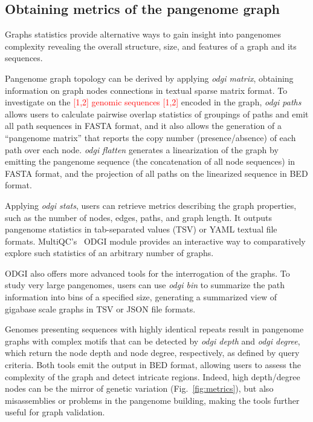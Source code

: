 \documentclass{bioinfo}
\newcommand{\REVIEWED}[1]{{\textcolor{Red}{#1}}}
\begin{document}


\subsection{Obtaining metrics of the pangenome graph}
\label{sec:metrics}

Graphs statistics provide alternative ways to gain insight into pangenomes complexity revealing the overall structure, size, and features of a graph and its sequences.

Pangenome graph topology can be derived by applying \textit{odgi matrix}, obtaining information on graph nodes connections in textual sparse matrix format.
To investigate on the \REVIEWED{[1,2] genomic sequences [1,2]} encoded in the graph, \textit{odgi paths} allows users to calculate pairwise overlap statistics of groupings of paths and emit all path sequences in FASTA format, and it also allows the generation of a ``pangenome matrix'' that reports the copy number (presence/absence) of each path over each node.
\textit{odgi flatten} generates a linearization of the graph by emitting the pangenome sequence (the concatenation of all node sequences) in FASTA format, and the projection of all paths on the linearized sequence in BED format.

Applying \textit{odgi stats}, users can retrieve metrics describing the graph properties, such as the number of nodes, edges, paths, and graph length.
It outputs pangenome statistics in tab-separated values (TSV) or YAML textual file formats.
MultiQC's~\citep{Ewels_2016} ODGI module %
provides an interactive way to comparatively explore such statistics of an arbitrary number of graphs.

ODGI also offers more advanced tools for the interrogation of the graphs.
To study very large pangenomes, users can use \textit{odgi bin} to summarize the path information into bins of a specified size, generating a summarized view of gigabase scale graphs in TSV or JSON file formats.

Genomes presenting sequences with highly identical repeats result in pangenome graphs with complex motifs that can be detected by \textit{odgi depth} and \textit{odgi degree}, which return the node depth and node degree, respectively, as defined by query criteria.
Both tools emit the output in BED format, allowing users to assess the complexity of the graph and detect intricate regions.
Indeed, high depth/degree nodes can be the mirror of genetic variation (Fig.~\ref{fig:metrics}), but also misassemblies or problems in the pangenome building, making the tools further useful for graph validation.
\end{document}
